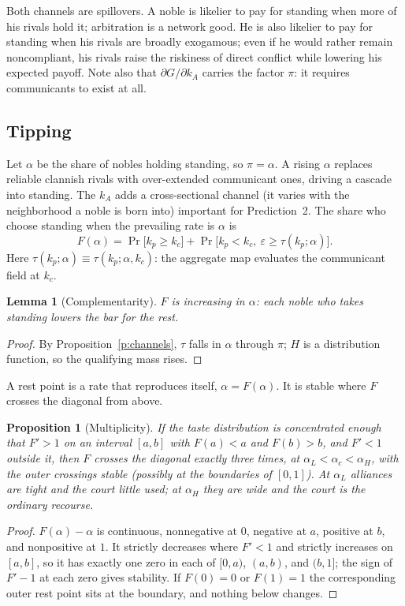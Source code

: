 \documentclass[12pt]{article}
\newtheorem{proposition}{Proposition}
\newtheorem{lemma}{Lemma}
\theoremstyle{definition}
\theoremstyle{remark}
\begin{document}
Both channels are spillovers. A noble is likelier to pay for standing when more of his rivals hold it; arbitration is a network good. He is also likelier to pay for standing when his rivals are broadly exogamous; even if he would rather remain noncompliant, his rivals raise the riskiness of direct conflict while lowering his expected payoff. Note also that $\partial G/\partial k_A$ carries the factor $\pi$: it requires communicants to exist at all.

\subsection{Tipping}

Let $\alpha$ be the share of nobles holding standing, so $\pi=\alpha$. A rising $\alpha$ replaces reliable clannish rivals with over-extended communicant ones, driving a cascade into standing. The $k_A$ adds a cross-sectional channel (it varies with the neighborhood a noble is born into) important for Prediction~2. The share who choose standing when the prevailing rate is $\alpha$ is
\begin{equation}\label{eq:F}
F(\alpha)=\Pr\bigl[k_p\ge k_c\bigr]+\Pr\bigl[k_p<k_c,\ \varepsilon\ge\tau(k_p;\alpha)\bigr].
\end{equation}
Here $\tau(k_p;\alpha)\equiv\tau(k_p;\alpha,k_c)$: the aggregate map evaluates the communicant field at $k_c$.

\begin{lemma}[Complementarity]\label{l:comp}
$F$ is increasing in $\alpha$: each noble who takes standing lowers the bar for the rest.
\end{lemma}
\begin{proof}
By Proposition~\ref{p:channels}, $\tau$ falls in $\alpha$ through $\pi$; $H$ is a distribution function, so the qualifying mass rises.
\end{proof}

A rest point is a rate that reproduces itself, $\alpha=F(\alpha)$. It is stable where $F$ crosses the diagonal from above.

\begin{proposition}[Multiplicity]\label{p:mult}
If the taste distribution is concentrated enough that $F'>1$ on an interval $[a,b]$ with $F(a)<a$ and $F(b)>b$, and $F'<1$ outside it, then $F$ crosses the diagonal exactly three times, at $\alpha_L<\alpha_c<\alpha_H$, with the outer crossings stable (possibly at the boundaries of $[0,1]$). At $\alpha_L$ alliances are tight and the court little used; at $\alpha_H$ they are wide and the court is the ordinary recourse.
\end{proposition}
\begin{proof}
$F(\alpha)-\alpha$ is continuous, nonnegative at $0$, negative at $a$, positive at $b$, and nonpositive at $1$. It strictly decreases where $F'<1$ and strictly increases on $[a,b]$, so it has exactly one zero in each of $[0,a)$, $(a,b)$, and $(b,1]$; the sign of $F'-1$ at each zero gives stability. If $F(0)=0$ or $F(1)=1$ the corresponding outer rest point sits at the boundary, and nothing below changes.
\end{proof}
\end{document}
